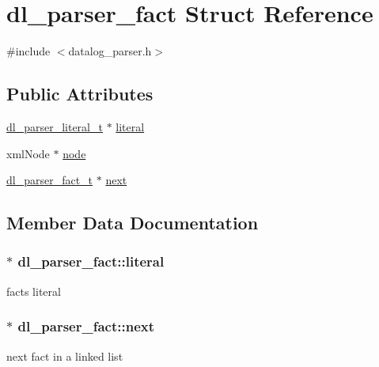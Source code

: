 \hypertarget{structdl__parser__fact}{}\section{dl\+\_\+parser\+\_\+fact Struct Reference}
\label{structdl__parser__fact}


{\ttfamily \#include $<$datalog\+\_\+parser.\+h$>$}

\subsection*{Public Attributes}
\begin{DoxyCompactItemize}
\item 
\hyperlink{datalog__parser_8h_adaef2eede58b9f7698925f7194af1373}{dl\+\_\+parser\+\_\+literal\+\_\+t} $\ast$ \hyperlink{structdl__parser__fact_ad6af5d620e22add4536cdc82bc9fd8f2}{literal}
\item 
xml\+Node $\ast$ \hyperlink{structdl__parser__fact_a1a5d064b161e07cfacedd5cdf871d04f}{node}
\item 
\hyperlink{datalog__parser_8h_ad97776994371341952d410f045d73e72}{dl\+\_\+parser\+\_\+fact\+\_\+t} $\ast$ \hyperlink{structdl__parser__fact_a10999e64de8ea33101bf4c9234c1ff99}{next}
\end{DoxyCompactItemize}


\subsection{Member Data Documentation}
\subsubsection[{\texorpdfstring{literal}{literal}}]{$\ast$ dl\+\_\+parser\+\_\+fact\+::literal}\hypertarget{structdl__parser__fact_ad6af5d620e22add4536cdc82bc9fd8f2}{}\label{structdl__parser__fact_ad6af5d620e22add4536cdc82bc9fd8f2}
fact\textquotesingle{}s literal 
\subsubsection[{\texorpdfstring{next}{next}}]{$\ast$ dl\+\_\+parser\+\_\+fact\+::next}\hypertarget{structdl__parser__fact_a10999e64de8ea33101bf4c9234c1ff99}{}\label{structdl__parser__fact_a10999e64de8ea33101bf4c9234c1ff99}
next fact in a linked list 
